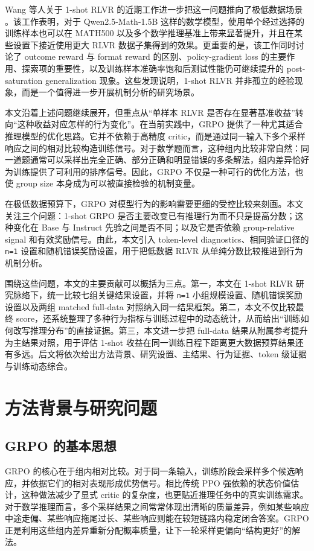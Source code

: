 \documentclass[12pt,a4paper]{ctexart}
\begin{document}
Wang 等人关于 1-shot RLVR 的近期工作进一步把这一问题推向了极低数据场景 \cite{wang2025oneshotrlvr}。该工作表明，对于 Qwen2.5-Math-1.5B 这样的数学模型，使用单个经过选择的训练样本也可以在 MATH500 以及多个数学推理基准上带来显著提升，并且在某些设置下接近使用更大 RLVR 数据子集得到的效果。更重要的是，该工作同时讨论了 outcome reward 与 format reward 的区别、policy-gradient loss 的主要作用、探索项的重要性，以及训练样本准确率饱和后测试性能仍可继续提升的 post-saturation generalization 现象。这些发现说明，1-shot RLVR 并非孤立的经验现象，而是一个值得进一步开展机制分析的研究场景。

本文沿着上述问题继续展开，但重点从“单样本 RLVR 是否存在显著基准收益”转向“这种收益对应怎样的行为变化”。在当前实践中，GRPO 提供了一种尤其适合推理模型的优化思路。它并不依赖于高精度 critic，而是通过同一输入下多个采样响应之间的相对比较构造训练信号。对于数学题而言，这种组内比较非常自然：同一道题通常可以采样出完全正确、部分正确和明显错误的多条解法，组内差异恰好为训练提供了可利用的排序信号。因此，GRPO 不仅是一种可行的优化方法，也使 group size 本身成为可以被直接检验的机制变量。

在极低数据预算下，GRPO 对模型行为的影响需要更细的受控比较来刻画。本文关注三个问题：1-shot GRPO 是否主要改变已有推理行为而不只是提高分数；这种变化在 Base 与 Instruct 先验之间是否不同；以及它是否依赖 group-relative signal 和有效奖励信号。由此，本文引入 token-level diagnostics、相同验证口径的 \texttt{n=1} 设置和随机错误奖励设置，用于把低数据 RLVR 从单纯分数比较推进到行为机制分析。

围绕这些问题，本文的主要贡献可以概括为三点。第一，本文在 1-shot RLVR 研究脉络下，统一比较七组关键结果设置，并将 \texttt{n=1} 小组规模设置、随机错误奖励设置以及两组 matched full-data 对照纳入同一结果框架。第二，本文不仅比较最终 score，还系统整理了多种行为指标与训练过程中的动态统计，从而给出“训练如何改写推理分布”的直接证据。第三，本文进一步把 full-data 结果从附属参考提升为主结果对照，用于评估 1-shot 收益在同一训练日程下距离更大数据预算结果还有多远。后文将依次给出方法背景、研究设置、主结果、行为证据、token 级证据与训练动态综合。

\section{方法背景与研究问题}

\subsection{GRPO 的基本思想}

GRPO 的核心在于组内相对比较。对于同一条输入，训练阶段会采样多个候选响应，并依据它们的相对表现形成优势信号。相比传统 PPO 强依赖的状态价值估计，这种做法减少了显式 critic 的复杂度，也更贴近推理任务中的真实训练需求。对于数学推理而言，多个采样结果之间常常体现出清晰的质量差异，例如某些响应中途走偏、某些响应拖尾过长、某些响应则能在较短链路内稳定闭合答案。GRPO 正是利用这些组内差异重新分配概率质量，让下一轮采样更偏向“结构更好”的解法。
\end{document}
